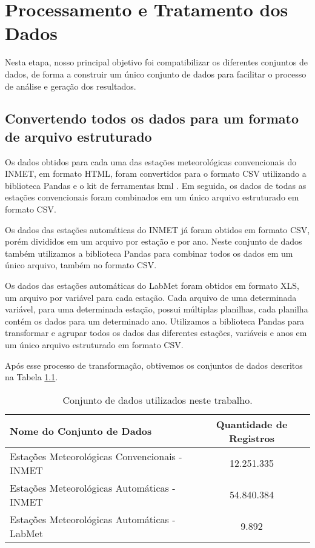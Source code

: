 \chapter{Processamento e Tratamento dos Dados}

Nesta etapa, nosso principal objetivo foi compatibilizar os diferentes conjuntos de dados, de forma a construir um único conjunto de dados para facilitar o processo de análise e geração dos resultados.

\section{Convertendo todos os dados para um formato de arquivo estruturado}

Os dados obtidos para cada uma das estações meteorológicas convencionais do INMET,  em formato HTML, foram convertidos para o formato CSV utilizando a biblioteca Pandas \cite{mckinney2011pandas} e o kit de ferramentas lxml \cite{behnel2005lxml}. Em seguida, os dados de todas as estações convencionais foram combinados em um único arquivo estruturado em formato CSV. 

Os dados das estações automáticas do INMET já foram obtidos em formato CSV, porém divididos em um arquivo por estação e por ano. Neste conjunto de dados também utilizamos a biblioteca Pandas para combinar todos os dados em um único arquivo, também no formato CSV.

Os dados das estações automáticas do LabMet foram obtidos em formato XLS, um arquivo por variável para cada estação. Cada arquivo de uma determinada variável, para uma determinada estação, possui múltiplas planilhas, cada planilha contém os dados para um determinado ano. Utilizamos a biblioteca Pandas para transformar e agrupar todos os dados das diferentes estações, variáveis e anos em um único arquivo estruturado em formato CSV.


Após esse processo de transformação, obtivemos os conjuntos de dados descritos na Tabela \ref{tab:lista_conjunto_de_dados}.

\begin{table}[H]
\caption{Conjunto de dados utilizados neste trabalho.}
\label{tab:lista_conjunto_de_dados}
\begin{tabular}{|l|c|}
\hline
\textbf{Nome do Conjunto de Dados} & \textbf{Quantidade de Registros}\\
\hline
Estações Meteorológicas Convencionais - INMET  & 12.251.335 \\
\hline
Estações Meteorológicas Automáticas - INMET & 54.840.384 \\
\hline
Estações Meteorológicas Automáticas - LabMet & 9.892 \\
\hline
\end{tabular}
\end{table}

